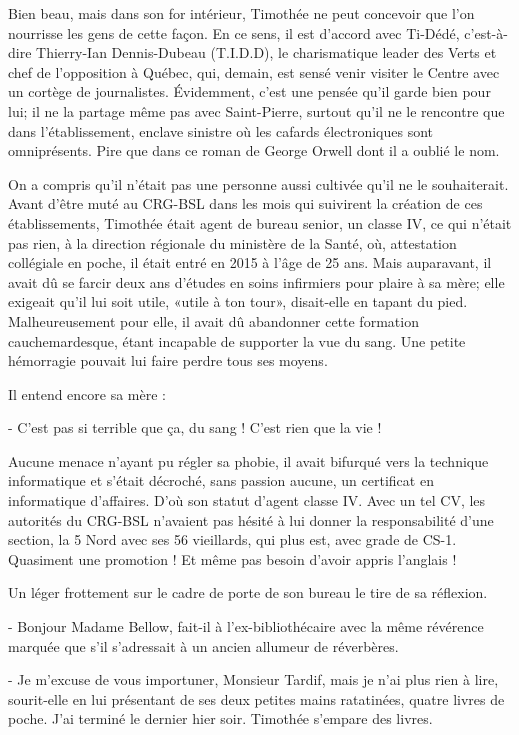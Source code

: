 Bien beau, mais dans son for intérieur, Timothée ne peut concevoir que l’on nourrisse les gens de cette façon. En ce sens, il est d’accord avec Ti-Dédé, c’est-à-dire Thierry-Ian Dennis-Dubeau (T.I.D.D), le charismatique leader des Verts et chef de l’opposition à Québec, qui, demain, est sensé venir visiter le Centre avec un cortège de journalistes. Évidemment, c’est une pensée qu’il garde bien pour lui; il ne la partage même pas avec Saint-Pierre, surtout qu’il ne le rencontre que dans l’établissement, enclave sinistre où les cafards électroniques sont omniprésents. Pire que dans ce roman de George Orwell dont il a oublié le nom.

On a compris qu’il n’était pas une personne aussi cultivée qu’il ne le souhaiterait. Avant d’être muté au CRG-BSL dans les mois qui suivirent la création de ces établissements, Timothée était agent de bureau senior, un classe IV, ce qui n’était pas rien, à la direction régionale du ministère de la Santé, où, attestation collégiale en poche, il était entré en 2015 à l’âge de 25 ans. Mais auparavant, il avait dû se farcir deux ans d’études en soins infirmiers pour plaire à sa mère; elle exigeait qu’il lui soit utile, «utile à ton tour», disait-elle en tapant du pied. Malheureusement pour elle, il avait dû abandonner cette formation cauchemardesque, étant incapable de supporter la vue du sang. Une petite hémorragie pouvait lui faire perdre tous ses moyens.

Il entend encore sa mère :

- C’est pas si terrible que ça, du sang ! C’est rien que la vie !

Aucune menace n’ayant pu régler sa phobie, il avait bifurqué vers la technique informatique et s’était décroché, sans passion aucune, un certificat en informatique d’affaires. D’où son statut d’agent classe IV. Avec un tel CV, les autorités du CRG-BSL n’avaient pas hésité à lui donner la responsabilité d’une section, la 5 Nord avec ses 56 vieillards, qui plus est, avec grade de CS-1. Quasiment une promotion ! Et même pas besoin d’avoir appris l’anglais !

Un léger frottement sur le cadre de porte de son bureau le tire de sa réflexion.

- Bonjour Madame Bellow, fait-il à l’ex-bibliothécaire avec la même révérence marquée que s’il s’adressait à un ancien allumeur de réverbères.

- Je m’excuse de vous importuner, Monsieur Tardif, mais je n’ai plus rien à lire, sourit-elle en lui présentant de ses deux petites mains ratatinées, quatre livres de poche. J’ai terminé le dernier hier soir.
Timothée s’empare des livres.

